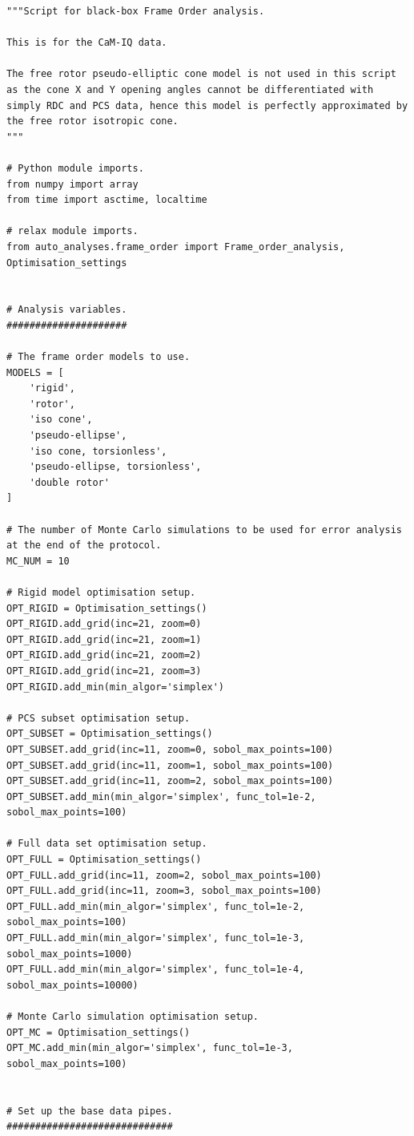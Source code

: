 \begin{lstlisting}
"""Script for black-box Frame Order analysis.

This is for the CaM-IQ data.

The free rotor pseudo-elliptic cone model is not used in this script as the cone X and Y opening angles cannot be differentiated with simply RDC and PCS data, hence this model is perfectly approximated by the free rotor isotropic cone.
"""

# Python module imports.
from numpy import array
from time import asctime, localtime

# relax module imports.
from auto_analyses.frame_order import Frame_order_analysis, Optimisation_settings


# Analysis variables.
#####################

# The frame order models to use.
MODELS = [
    'rigid',
    'rotor',
    'iso cone',
    'pseudo-ellipse',
    'iso cone, torsionless',
    'pseudo-ellipse, torsionless',
    'double rotor'
]

# The number of Monte Carlo simulations to be used for error analysis at the end of the protocol.
MC_NUM = 10

# Rigid model optimisation setup.
OPT_RIGID = Optimisation_settings()
OPT_RIGID.add_grid(inc=21, zoom=0)
OPT_RIGID.add_grid(inc=21, zoom=1)
OPT_RIGID.add_grid(inc=21, zoom=2)
OPT_RIGID.add_grid(inc=21, zoom=3)
OPT_RIGID.add_min(min_algor='simplex')

# PCS subset optimisation setup.
OPT_SUBSET = Optimisation_settings()
OPT_SUBSET.add_grid(inc=11, zoom=0, sobol_max_points=100)
OPT_SUBSET.add_grid(inc=11, zoom=1, sobol_max_points=100)
OPT_SUBSET.add_grid(inc=11, zoom=2, sobol_max_points=100)
OPT_SUBSET.add_min(min_algor='simplex', func_tol=1e-2, sobol_max_points=100)

# Full data set optimisation setup.
OPT_FULL = Optimisation_settings()
OPT_FULL.add_grid(inc=11, zoom=2, sobol_max_points=100)
OPT_FULL.add_grid(inc=11, zoom=3, sobol_max_points=100)
OPT_FULL.add_min(min_algor='simplex', func_tol=1e-2, sobol_max_points=100)
OPT_FULL.add_min(min_algor='simplex', func_tol=1e-3, sobol_max_points=1000)
OPT_FULL.add_min(min_algor='simplex', func_tol=1e-4, sobol_max_points=10000)

# Monte Carlo simulation optimisation setup.
OPT_MC = Optimisation_settings()
OPT_MC.add_min(min_algor='simplex', func_tol=1e-3, sobol_max_points=100)


# Set up the base data pipes.
#############################


\end{lstlisting}
